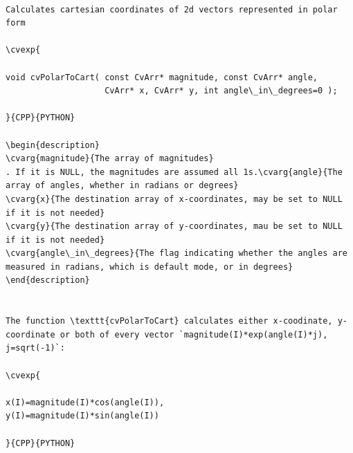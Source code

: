 \label{PolarToCart}
\begin{verbatim}

Calculates cartesian coordinates of 2d vectors represented in polar form

\cvexp{

void cvPolarToCart( const CvArr* magnitude, const CvArr* angle,
                    CvArr* x, CvArr* y, int angle\_in\_degrees=0 );

}{CPP}{PYTHON}

\begin{description}
\cvarg{magnitude}{The array of magnitudes}
. If it is NULL, the magnitudes are assumed all 1s.\cvarg{angle}{The array of angles, whether in radians or degrees}
\cvarg{x}{The destination array of x-coordinates, may be set to NULL if it is not needed}
\cvarg{y}{The destination array of y-coordinates, mau be set to NULL if it is not needed}
\cvarg{angle\_in\_degrees}{The flag indicating whether the angles are measured in radians, which is default mode, or in degrees}
\end{description}


The function \texttt{cvPolarToCart} calculates either x-coodinate, y-coordinate or both of every vector `magnitude(I)*exp(angle(I)*j), j=sqrt(-1)`:

\cvexp{

x(I)=magnitude(I)*cos(angle(I)),
y(I)=magnitude(I)*sin(angle(I))

}{CPP}{PYTHON}


\end{verbatim}
\label{Pow}
